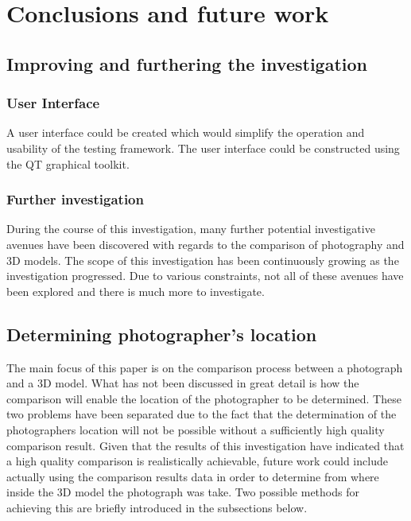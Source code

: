 \documentclass[11pt,a4paper]{report}
\begin{document}
\chapter{Conclusions and future work}
	\section{Improving and furthering the investigation}
		\subsection{User Interface}
			A user interface could be created which would simplify the operation and usability of the testing framework. The user interface could be constructed using the QT graphical toolkit.
		
		\subsection{Further investigation}
			During the course of this investigation, many further potential investigative avenues have been discovered with regards to the comparison of photography and 3D models. The scope of this investigation has been continuously growing as the investigation progressed. Due to various constraints, not all of these avenues have been explored and there is much more to investigate.
		
	\section{Determining photographer's location}
		The main focus of this paper is on the comparison process between a photograph and a 3D model. What has not been discussed in great detail is how the comparison will enable the location of the photographer to be determined. These two problems have been separated due to the fact that the determination of the photographers location will not be possible without a sufficiently high quality comparison result. Given that the results of this investigation have indicated that a high quality comparison is realistically achievable, future work could include actually using the comparison results data in order to determine from where inside the 3D model the photograph was take. Two possible methods for achieving this are briefly introduced in the subsections below.
		
\end{document}
